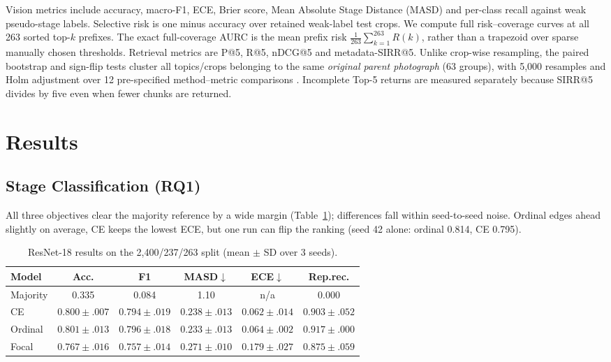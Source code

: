 \documentclass[conference,a4paper]{IEEEtran}
\begin{document}
Vision metrics include accuracy, macro-F1, ECE, Brier score, Mean Absolute Stage Distance (MASD) and per-class recall against weak pseudo-stage labels. Selective risk is one minus accuracy over retained weak-label test crops. We compute full risk--coverage curves at all 263 sorted top-$k$ prefixes. The exact full-coverage AURC is the mean prefix risk $\frac{1}{263}\sum_{k=1}^{263}R(k)$, rather than a trapezoid over sparse manually chosen thresholds. Retrieval metrics are P@5, R@5, nDCG@5 \cite{jarvelin2002ndcg} and metadata-SIRR@5. Unlike crop-wise resampling, the paired bootstrap and sign-flip tests cluster all topics/crops belonging to the same \emph{original parent photograph} (63 groups), with 5{,}000 resamples and Holm adjustment over 12 pre-specified method--metric comparisons \cite{holm1979sequential}. Incomplete Top-5 returns are measured separately because SIRR@5 divides by five even when fewer chunks are returned.

\section{Results}

\subsection{Stage Classification (RQ1)}

All three objectives clear the majority reference by a wide margin (Table~\ref{tab:vision-results}); differences fall within seed-to-seed noise. Ordinal edges ahead slightly on average, CE keeps the lowest ECE, but one run can flip the ranking (seed 42 alone: ordinal 0.814, CE 0.795).

\begin{table}[t]
\centering
\caption{ResNet-18 results on the 2,400/237/263 split (mean $\pm$ SD over 3 seeds).}
\label{tab:vision-results}
\scriptsize
\setlength{\tabcolsep}{2.5pt}
\begin{tabular}{lccccc}
\toprule
\textbf{Model} & \textbf{Acc.} & \textbf{F1} & \textbf{MASD}$\downarrow$ & \textbf{ECE}$\downarrow$ & \textbf{Rep.rec.} \\
\midrule
Majority   & 0.335 & 0.084 & 1.10 & n/a & 0.000 \\
CE           & $0.800{\pm}.007$   & $0.794{\pm}.019$   & $0.238{\pm}.013$   & $0.062{\pm}.014$   & $0.903{\pm}.052$ \\
Ordinal      & $0.801{\pm}.013$   & $0.796{\pm}.018$   & $0.233{\pm}.013$   & $0.064{\pm}.002$   & $0.917{\pm}.000$ \\
Focal        & $0.767{\pm}.016$   & $0.757{\pm}.014$   & $0.271{\pm}.010$   & $0.179{\pm}.027$   & $0.875{\pm}.059$ \\
\bottomrule
\end{tabular}
\end{table}
\end{document}
